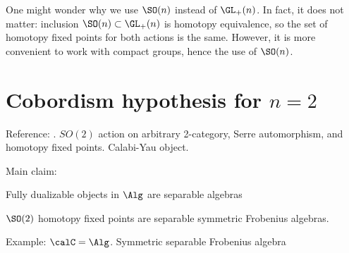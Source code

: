 \begin{remark}
  One might wonder why we use $\SO(n)$ instead of $\GL_+(n)$. In fact, it does
  not matter: inclusion $\SO(n)\subset \GL_+(n)$ is homotopy equivalence, so the
  set of homotopy fixed points for both actions is the same. However, it is more
  convenient to work with compact groups, hence the use of $\SO(n)$.
\end{remark}



\section{Cobordism hypothesis for $n=2$}\label{s:cobordism-hypothesis-dim2}

Reference: \cite{hesse}.
$SO(2)$ action on arbitrary 2-category, Serre automorphism, and homotopy fixed
points. Calabi-Yau object.


Main claim:

Fully dualizable objects in $\Alg$ are separable algebras

$\SO(2)$ homotopy fixed points are separable symmetric Frobenius algebras.





Example: $\calC=\Alg$. Symmetric separable Frobenius algebra
